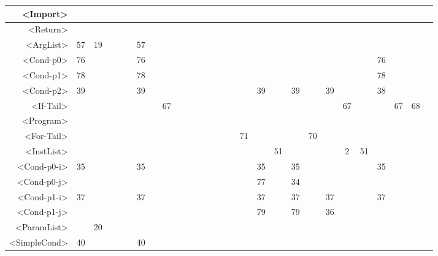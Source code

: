 \begin{tabular}{r|c@{ }c@{ }c@{ }c@{ }c@{ }c@{ }c@{ }c@{ }c@{ }c@{ }c@{ }c@{ }c@{ }c@{ }c@{ }c@{ }c@{ }c@{ }c@{ }c@{ }c@{ }c@{ }c@{ }c@{ }c@{ }c@{ }c@{ }}
<Import> &   &   &   &   &   &   &   &   &   &   &   &   &   &   &   &   &   &   &   &   &   &   &   &   &   &   &   \\\hline
<Return> &   &   &   &   &   &   &   &   &   &   &   &   &   &   &   &   &   &   &   &   &   &   &   &   &   &   &   \\\hline
<ArgList> & 57 & 19 &   &   &   & 57 &   &   &   &   &   &   &   &   &   &   &   &   &   &   &   &   &   &   &   &   &   \\\hline
<Cond-p0> & 76 &   &   &   &   & 76 &   &   &   &   &   &   &   &   &   &   &   &   &   &   &   &   &   & 76 &   &   &   \\\hline
<Cond-p1> & 78 &   &   &   &   & 78 &   &   &   &   &   &   &   &   &   &   &   &   &   &   &   &   &   & 78 &   &   &   \\\hline
<Cond-p2> & 39 &   &   &   &   & 39 &   &   &   &   &   &   &   &   &   &   & 39 &   & 39 &   & 39 &   &   & 38 &   &   &   \\\hline
<If-Tail> &   &   &   &   &   &   &   & 67 &   &   &   &   &   &   &   &   &   &   &   &   &   & 67 &   &   & 67 & 68 &   \\\hline
<Program> &   &   &   &   &   &   &   &   &   &   &   &   &   &   &   &   &   &   &   &   &   &   &   &   &   &   &   \\\hline
<For-Tail> &   &   &   &   &   &   &   &   &   &   &   &   &   &   &   & 71 &   &   &   & 70 &   &   &   &   &   &   &   \\\hline
<InstList> &   &   &   &   &   &   &   &   &   &   &   &   &   &   &   &   &   & 51 &   &   &   & 2 & 51 &   &   &   &   \\\hline
<Cond-p0-i> & 35 &   &   &   &   & 35 &   &   &   &   &   &   &   &   &   &   & 35 &   & 35 &   &   &   &   & 35 &   &   &   \\\hline
<Cond-p0-j> &   &   &   &   &   &   &   &   &   &   &   &   &   &   &   &   & 77 &   & 34 &   &   &   &   &   &   &   &   \\\hline
<Cond-p1-i> & 37 &   &   &   &   & 37 &   &   &   &   &   &   &   &   &   &   & 37 &   & 37 &   & 37 &   &   & 37 &   &   &   \\\hline
<Cond-p1-j> &   &   &   &   &   &   &   &   &   &   &   &   &   &   &   &   & 79 &   & 79 &   & 36 &   &   &   &   &   &   \\\hline
<ParamList> &   & 20 &   &   &   &   &   &   &   &   &   &   &   &   &   &   &   &   &   &   &   &   &   &   &   &   &   \\\hline
<SimpleCond> & 40 &   &   &   &   & 40 &   &   &   &   &   &   &   &   &   &   &   &   &   &   &   &   &   &   &   &   &   \\\hline

\end{tabular}
